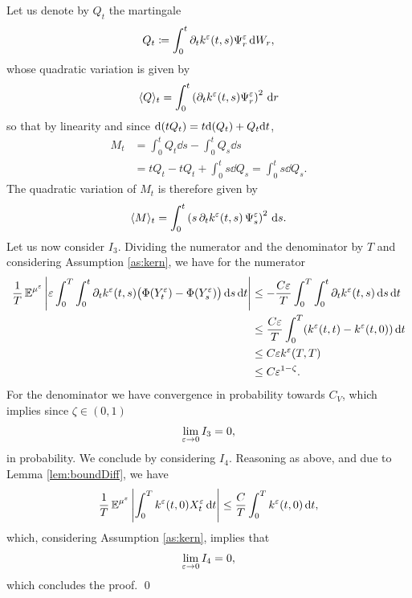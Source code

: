 \documentclass[10pt]{article}
\begin{document}
Let us denote by $Q_t$ the martingale
\begin{equation}
	Q_t \coloneqq \int_0^t \partial_t k^\varepsilon(t, s)\Psi_r^\varepsilon \,\mathrm{d} W_r,
\end{equation}
whose quadratic variation is given by
\begin{equation}
	\langle Q \rangle_t = \int_0^t \left(\partial_t k^\varepsilon(t, s)\Psi_r^\varepsilon\right)^2 \,\mathrm{d} r
\end{equation}
so that by linearity and since $\mathrm{d}(tQ_t) = t\mathrm{d}(Q_t) + Q_t \mathrm{d} t$,  
\begin{equation}
\begin{aligned}
	M_t &= \int_0^t Q_t \dd s - \int_0^t Q_s \dd s\\
	&= tQ_t - t Q_t + \int_0^t s \dd Q_s = \int_0^t s \dd Q_s.
\end{aligned}
\end{equation}
The quadratic variation of $M_t$ is therefore given by
\begin{equation}
	\langle M \rangle_t = \int_0^t \left( s \, \partial_t k^\varepsilon(t, s) \, \Psi^\varepsilon_s \right)^2 \,\mathrm{d} s.
\end{equation}
 Let us now consider $I_3$. Dividing the numerator and the denominator by $T$ and considering Assumption \ref{as:kern}, we have for the numerator
\begin{equation}
\begin{aligned}
	\frac1T \operatorname{\mathbb{E}}^{\mu^\varepsilon} \left\lvert\varepsilon \int_0^T \int_0^t \partial_t k^\varepsilon(t, s) \big(\Phi(Y^\varepsilon_t)- \Phi(Y^\varepsilon_s)\big) \,\mathrm{d} s \,\mathrm{d} t\right\rvert &\leq - \frac{C \varepsilon}{T} \int_0^T \int_0^t \partial_t k^\varepsilon(t, s) \,\mathrm{d} s \,\mathrm{d} t\\
	&\leq \frac{C \varepsilon}{T} \int_0^T (k^\varepsilon(t, t) - k^\varepsilon(t, 0)) \,\mathrm{d} t\\
	&\leq C\varepsilon k^\varepsilon(T, T)\\
	&\leq C\varepsilon^{1-\zeta}.
\end{aligned}
\end{equation}
For the denominator we have convergence in probability towards $C_V$, which implies since $\zeta \in (0, 1)$
\begin{equation}
	\lim_{\varepsilon \to 0} I_3 = 0,	
\end{equation}
in probability. We conclude by considering $I_4$. Reasoning as above, and due to Lemma \ref{lem:boundDiff}, we have
\begin{equation}
	\frac1T \operatorname{\mathbb{E}}^{\mu^\varepsilon} \left\lvert\int_0^T k^\varepsilon(t, 0) X^\varepsilon_t \,\mathrm{d} t \right\rvert \leq  \frac{C}{T} \int_0^T k^\varepsilon(t, 0) \,\mathrm{d} t,
\end{equation}
which, considering Assumption \ref{as:kern}, implies that
\begin{equation}
	\lim_{\varepsilon \to 0} I_4 = 0,	
\end{equation}
which concludes the proof. \qed
\end{document}
